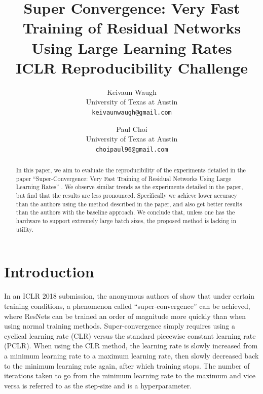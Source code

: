 \documentclass[10pt,twocolumn,letterpaper]{article}
\begin{document}
\title{
    Super Convergence: Very Fast Training of Residual Networks Using Large
    Learning Rates\\
    \large ICLR Reproducibility Challenge}

\author{Keivaun Waugh\\
University of Texas at Austin\\
{\tt\small keivaunwaugh@gmail.com}
\and
Paul Choi\\
University of Texas at Austin\\
{\tt\small choipaul96@gmail.com}
}

\maketitle

\begin{abstract}
In this paper, we aim to evaluate the reproducibility of the
    experiments detailed in the paper ``Super-Convergence: Very Fast
    Training of Residual Networks Using Large Learning Rates''
    \cite{SuperConvergence}. We observe similar trends as the
    experiments detailed in the paper, but find that the results are
    less pronounced. Specifically we achieve lower accuracy than the
    authors using the method described in the paper, and also get
    better results than the authors with the baseline approach. We
    conclude that, unless one has the hardware to support extremely
    large batch sizes, the proposed method is lacking in utility.
\end{abstract}

\section{Introduction}
In an ICLR 2018 submission, the anonymous authors of \cite{SuperConvergence}
show that under certain training conditions, a phenomenon called
``super-convergence'' can be achieved, where ResNets \cite{ResNet} can be
trained an order of magnitude more quickly than when using normal training
methods.  Super-convergence simply requires using a cyclical learning rate
(CLR) versus the standard piecewise constant learning rate (PCLR). When using
the CLR method, the learning rate is slowly increased from a minimum learning
rate to a maximum learning rate, then slowly decreased back to the minimum
learning rate again, after which training stops. The number of iterations taken
to go from the minimum learning rate to the maximum and vice versa is referred
to as the step-size and is a hyperparameter.
\end{document}
